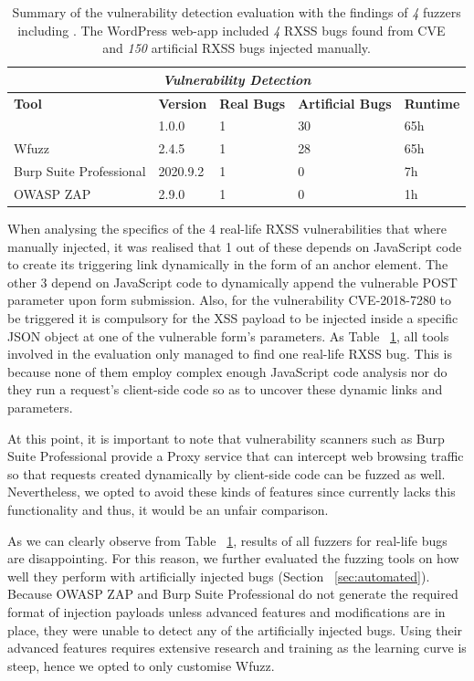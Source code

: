 \begin{table}[ht]
\centering
 \begin{tabular}{@{}|l|l|l|l|l|@{}}
 \hline
  \multicolumn{5}{|c|}{\textit{\textbf{Vulnerability Detection}}} \\
 \hline
 \textbf{Tool} & \textbf{Version} & \textbf{Real Bugs} & \textbf{Artificial Bugs} & \textbf{Runtime} \\ 
 \hline\hline
 \pname{} & 1.0.0 & 1 & 30 & 65h  \\ 
 \hline
 Wfuzz & 2.4.5 & 1 & 28 & 65h  \\ 
 \hline
 Burp Suite Professional & 2020.9.2 & 1 & 0 & 7h \\ 
 \hline
 OWASP ZAP  & 2.9.0 & 1 & 0 & 1h  \\
 \hline
 \end{tabular}
 \caption{Summary of the vulnerability detection evaluation with the findings of \emph{4} fuzzers including \pname{}. The WordPress web-app included \emph{4} RXSS bugs found from CVE {~\cite{cve}} and \emph{150} artificial RXSS bugs injected manually.}

 \label{tools_table}
\end{table}

When analysing the specifics of the 4 real-life RXSS vulnerabilities that where manually injected, it was realised that 1 out of these depends on JavaScript code to create its triggering link dynamically in the form of an anchor element. The other 3 depend on JavaScript code to dynamically append the vulnerable POST parameter upon form submission. Also, for the vulnerability CVE-2018-7280 to be triggered it is compulsory for the XSS payload to be injected inside a specific JSON object at one of the vulnerable form's parameters. As Table ~\ref{tools_table}, all tools involved in the evaluation only managed to find one real-life RXSS bug. This is because none of them employ complex enough JavaScript code analysis nor do they run a request's client-side code so as to uncover these dynamic links and parameters.

At this point, it is important to note that vulnerability scanners such as Burp Suite Professional provide a Proxy service that can intercept web browsing traffic so that requests created dynamically by client-side code can be fuzzed as well. Nevertheless, we opted to avoid these kinds of features since \pname{} currently lacks this functionality and thus, it would be an unfair comparison.

As we can clearly observe from Table ~\ref{tools_table}, results of all fuzzers for real-life bugs are disappointing. For this reason, we further evaluated the fuzzing tools on how well they perform with artificially injected bugs (Section ~\ref{sec:automated}). Because OWASP ZAP and Burp Suite Professional do not generate the required format of injection payloads unless advanced features and modifications are in place, they were unable to detect any of the artificially injected bugs. Using their advanced features requires extensive research and training as the learning curve is steep, hence we opted to only customise Wfuzz.

